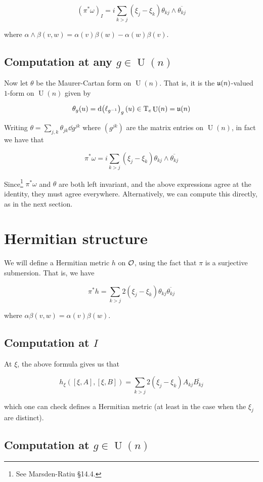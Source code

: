 \documentclass{article}
\DeclareMathOperator{\U}{U}
\renewcommand{\u}{\mfu}
\begin{document}
\[(\pi^*\omega)_I = i \sum_{k > j}(\xi_j - \xi_k)\theta_{kj}\wedge \overline{\theta_{kj}}\]

where \(\alpha \wedge \beta(v, w) = \alpha(v)\beta(w) - \alpha(w)\beta(v)\).

\subsection{Computation at any \(g \in \U(n)\)}

Now let \(\theta\) be the Maurer-Cartan form on \(\U(n)\). That is, it is the \(\u(n)\)-valued \(1\)-form on \(\U(n)\) given by

\[\theta_g(u) = \dd (\ell_{g^{-1}})_g(u) \in \TT_e\U(n) = \u(n)\]

Writing \(\theta = \sum_{j, k}\theta_{jk}\dd g^{jk}\) where \((g^{jk})\) are the matrix entries on \(\U(n)\), in fact we have that

\[\pi^*\omega = i \sum_{k > j}(\xi_j - \xi_k)\theta_{kj}\wedge \overline{\theta_{kj}}\]

Since\footnote{See Marsden-Ratiu \S14.4.} \(\pi^*\omega\) and \(\theta\) are both left invariant, and the above expressions agree at the identity, they must agree everywhere. Alternatively, we can compute this directly, as in the next section.

\section{Hermitian structure}

We will define a Hermitian metric \(h\) on \(\mathcal{O}\), using the fact that \(\pi\) is a surjective submersion. That is, we have

\[\pi^*h = \sum_{k > j}2(\xi_j - \xi_k)\theta_{kj}\overline{\theta_{kj}}\]

where \(\alpha\beta(v, w) = \alpha(v)\beta(w)\).

\subsection{Computation at \(I\)}

At \(\xi\), the above formula gives us that

\[h_\xi([\xi, A], [\xi, B]) = \sum_{k > j}2(\xi_j - \xi_k)A_{kj}\overline{B_{kj}}\]

which one can check defines a Hermitian metric (at least in the case when the \(\xi_j\) are distinct).

\subsection{Computation at \(g \in \U(n)\)}
\end{document}
